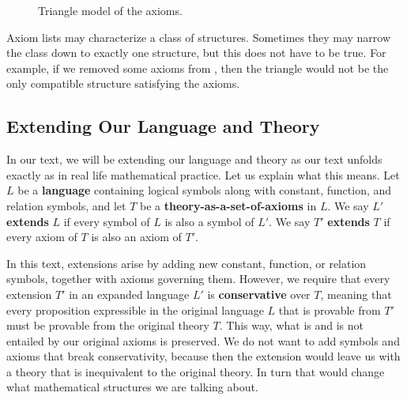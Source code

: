 \begin{example}
	\begin{figure}[H]
		\centering
		\caption{Triangle model of the axioms.}
	\end{figure}
\end{example}

Axiom lists may characterize a class of structures. 
Sometimes they may narrow the class down to exactly one structure, but this does not have to be true. 
For example, if we removed some axioms from , then the triangle would not be the only compatible structure satisfying the axioms. 

\subsection{Extending Our Language and Theory}

In our text, we will be extending our language and theory as our text unfolds exactly as in real life mathematical practice. 
Let us explain what this means. 
Let $L$ be a \textbf{language} containing logical symbols along with constant, function, and relation symbols, and let $T$ be a \textbf{theory-as-a-set-of-axioms} in $L$. 
We say $L'$ \textbf{extends} $L$ if every symbol of $L$ is also a symbol of $L'$.
We say $T'$ \textbf{extends} $T$ if every axiom of $T$ is also an axiom of $T'$.

In this text, extensions arise by adding new constant, function, or relation symbols, together with axioms governing them. 
However, we require that every extension $T'$ in an expanded language $L'$ is \textbf{conservative} over $T$, meaning that every proposition expressible in the original language $L$ that is provable from $T'$ must be provable from the original theory $T$.
This way, what is and is not entailed by our original axioms is preserved. 
We do not want to add symbols and axioms that break conservativity, because then the extension would leave us with a theory that is inequivalent to the original theory.
In turn that would change what mathematical structures we are talking about.

